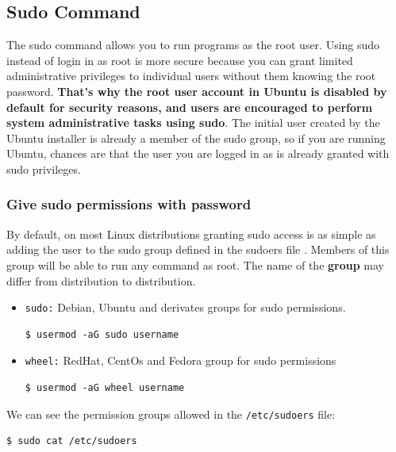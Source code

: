 \documentclass{article}
\newenvironment{codetemplate}[1][]{%
  \mybasecolorbox[#1]
  \itshape
}{%
  \endmybasecolorbox
}
\begin{document}
\subsection{Sudo Command}
The sudo command allows you to run programs as the root user. Using sudo instead of login in as root is more secure because you can grant limited administrative privileges to individual users without them knowing the root password. \textbf{That's why the root user account in Ubuntu is disabled by default for security reasons, and users are encouraged to perform system administrative tasks using sudo}. The initial user created by the Ubuntu installer is already a member of the sudo group, so if you are running Ubuntu, chances are that the user you are logged in as is already granted with sudo privileges.

\subsubsection{Give sudo permissions with password}
By default, on most Linux distributions granting sudo access is as simple as adding the user to the sudo group defined in the sudoers file . Members of this group will be able to run any command as root. The name of the \textbf{group} may differ from distribution to distribution.

\begin{itemize}
    \item \verb|sudo:| Debian, Ubuntu and derivates groups for sudo permissions.
\begin{codetemplate}{}
\begin{verbatim}
$ usermod -aG sudo username
\end{verbatim}
\end{codetemplate}
    \item \verb|wheel:| RedHat, CentOs and Fedora group for sudo permissions
\begin{codetemplate}{}
\begin{verbatim}
$ usermod -aG wheel username
\end{verbatim}
\end{codetemplate}
\end{itemize}

We can see the permission groups allowed in the \verb|/etc/sudoers| file:

\begin{codetemplate}{}
\begin{verbatim}
$ sudo cat /etc/sudoers
\end{verbatim}
\end{codetemplate}
\end{document}
